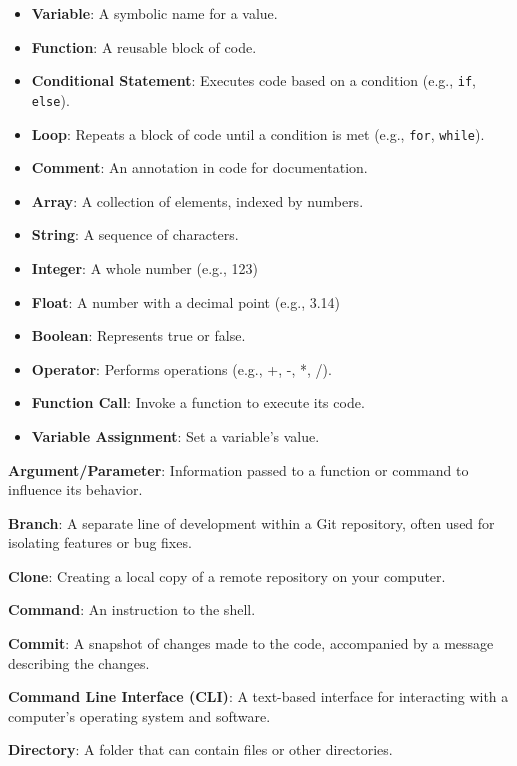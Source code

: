 \documentclass[9pt]{cheatsheet}
\begin{document}
\begin{multicols*}{3}

\begin{itemize}
  \item \textbf{Variable}: A symbolic name for a value.
  \item \textbf{Function}: A reusable block of code.
  \item \textbf{Conditional Statement}: Executes code based on a condition (e.g., \texttt{if}, \texttt{else}).
  \item \textbf{Loop}: Repeats a block of code until a condition is met (e.g., \texttt{for}, \texttt{while}).
  \item \textbf{Comment}: An annotation in code for documentation.
  \item \textbf{Array}: A collection of elements, indexed by numbers.
  \item \textbf{String}: A sequence of characters.
  \item \textbf{Integer}: A whole number (e.g., 123)
  \item \textbf{Float}: A number with a decimal point (e.g., 3.14)
  \item \textbf{Boolean}: Represents true or false.
  \item \textbf{Operator}: Performs operations (e.g., +, -, *, /).
  \item \textbf{Function Call}: Invoke a function to execute its code.
  \item \textbf{Variable Assignment}: Set a variable's value.
\end{itemize}


\textbf{Argument/Parameter}: Information passed to a function or command to influence its behavior.

\textbf{Branch}: A separate line of development within a Git repository, often used for isolating features or bug fixes.

\textbf{Clone}: Creating a local copy of a remote repository on your computer.

\textbf{Command}: An instruction to the shell.

\textbf{Commit}: A snapshot of changes made to the code, accompanied by a message describing the changes.

\textbf{Command Line Interface (CLI)}: A text-based interface for interacting with a computer's operating system and software.

\textbf{Directory}: A folder that can contain files or other directories.


\end{multicols*}
\end{document}
